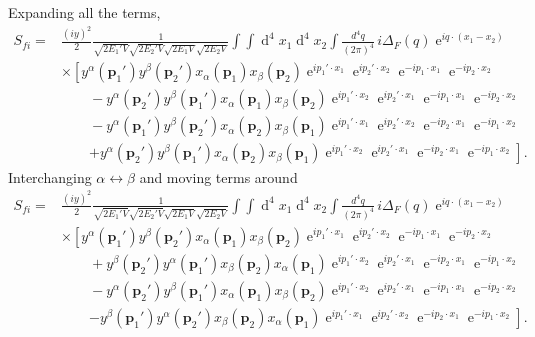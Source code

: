 Expanding all the terms,
\begin{align}
   S_{fi}
    =&\frac{\left( iy \right)^{2}}{2}\frac{1 }{\sqrt{2 E_1'V}\sqrt{2 E_2'V}\sqrt{2 E_1V}\sqrt{2 E_2V}}\int\int \operatorname{d}^4x_1 \operatorname{d}^4x_2
\int\frac{d^4q}{(2\pi)^4}\,i\Delta_F(q)\operatorname{e}^{i q\cdot(x_1-x_2)} \nonumber\\
&
 \times \left[ y^{\alpha}(\mathbf{p}_1')y^{\beta}(\mathbf{p}_2')x_{\alpha}(\mathbf{p}_1)x_{\beta}(\mathbf{p}_2)
\operatorname{e}^{i p_1'\cdot x_1}\operatorname{e}^{i p_2'\cdot x_2}
\operatorname{e}^{-i p_1\cdot x_1}\operatorname{e}^{-i p_2\cdot x_2}  \right. \nonumber\\
&\qquad- y^{\alpha}(\mathbf{p}_2')y^{\beta}(\mathbf{p}_1')x_{\alpha}(\mathbf{p}_1)x_{\beta}(\mathbf{p}_2)
\operatorname{e}^{i p_1'\cdot x_2}\operatorname{e}^{i p_2'\cdot x_1} 
\operatorname{e}^{-i p_1\cdot x_1}\operatorname{e}^{-i p_2\cdot x_2}  \nonumber\\
&\qquad -y^{\alpha}(\mathbf{p}_1')y^{\beta}(\mathbf{p}_2')x_{\alpha}(\mathbf{p}_2)x_{\beta}(\mathbf{p}_1)
\operatorname{e}^{i p_1'\cdot x_1}\operatorname{e}^{i p_2'\cdot x_2}
\operatorname{e}^{-i p_2\cdot x_1}\operatorname{e}^{-i p_1\cdot x_2} \nonumber\\
&\qquad\left. + y^{\alpha}(\mathbf{p}_2')y^{\beta}(\mathbf{p}_1')x_{\alpha}(\mathbf{p}_2)x_{\beta}(\mathbf{p}_1)
\operatorname{e}^{i p_1'\cdot x_2}\operatorname{e}^{i p_2'\cdot x_1}
\operatorname{e}^{-i p_2\cdot x_1}\operatorname{e}^{-i p_1\cdot x_2}   \right].
\end{align}
Interchanging $\alpha\leftrightarrow\beta$ and moving terms around
\begin{align}
   S_{fi}
    =&\frac{\left( iy \right)^{2}}{2}\frac{1 }{\sqrt{2 E_1'V}\sqrt{2 E_2'V}\sqrt{2 E_1V}\sqrt{2 E_2V}}\int\int \operatorname{d}^4x_1 \operatorname{d}^4x_2
\int\frac{d^4q}{(2\pi)^4}\,i\Delta_F(q)\operatorname{e}^{i q\cdot(x_1-x_2)} \nonumber\\
&
 \times \left[ y^{\alpha}(\mathbf{p}_1')y^{\beta}(\mathbf{p}_2')x_{\alpha}(\mathbf{p}_1)x_{\beta}(\mathbf{p}_2)
\operatorname{e}^{i p_1'\cdot x_1}\operatorname{e}^{i p_2'\cdot x_2}
\operatorname{e}^{-i p_1\cdot x_1}\operatorname{e}^{-i p_2\cdot x_2}  \right. \nonumber\\
&\qquad+ y^{\beta}(\mathbf{p}_2')y^{\alpha}(\mathbf{p}_1')x_{\beta}(\mathbf{p}_2)x_{\alpha}(\mathbf{p}_1)
\operatorname{e}^{i p_1'\cdot x_2}\operatorname{e}^{i p_2'\cdot x_1}
\operatorname{e}^{-i p_2\cdot x_1}\operatorname{e}^{-i p_1\cdot x_2} \nonumber\\
&\qquad- y^{\alpha}(\mathbf{p}_2')y^{\beta}(\mathbf{p}_1')x_{\alpha}(\mathbf{p}_1)x_{\beta}(\mathbf{p}_2)
\operatorname{e}^{i p_1'\cdot x_2}\operatorname{e}^{i p_2'\cdot x_1} 
\operatorname{e}^{-i p_1\cdot x_1}\operatorname{e}^{-i p_2\cdot x_2}  \nonumber\\
&\qquad\left. -y^{\beta}(\mathbf{p}_1')y^{\alpha}(\mathbf{p}_2')x_{\beta}(\mathbf{p}_2)x_{\alpha}(\mathbf{p}_1)
\operatorname{e}^{i p_1'\cdot x_1}\operatorname{e}^{i p_2'\cdot x_2}
\operatorname{e}^{-i p_2\cdot x_1}\operatorname{e}^{-i p_1\cdot x_2}   \right].
\end{align}
